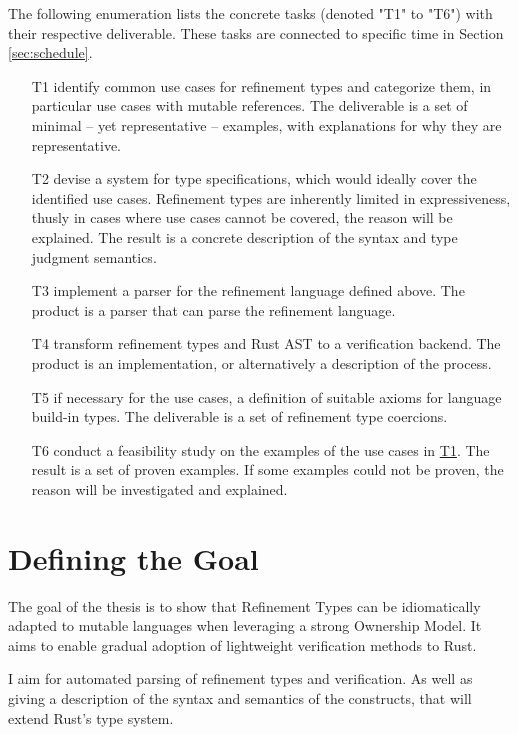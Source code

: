 \documentclass[11pt]{article}
\begin{document}
The following enumeration lists the concrete tasks (denoted "T1" to "T6") with their respective deliverable. These tasks are connected to specific time in Section \ref{sec:schedule}.

\begin{itemize}
	\item[T1] \label{itm:T1} identify common use cases for refinement types and categorize them, in particular use cases with mutable references. The deliverable is a set of minimal -- yet representative -- examples, with explanations for why they are representative.
	\item[T2] devise a system for type specifications, which would ideally cover the identified use cases. Refinement types are inherently limited in expressiveness, thusly in cases where use cases cannot be covered, the reason will be explained. The result is a concrete description of the syntax and type judgment semantics.
	\item[T3] implement a parser for the refinement language defined above. The product is a parser that can parse the refinement language.
	\item[T4] transform refinement types and Rust AST to a verification backend. The product is an implementation, or alternatively a description of the process.
	\item[T5] if necessary for the use cases, a definition of suitable axioms for language build-in types. The deliverable is a set of refinement type coercions.
	\item[T6] conduct a feasibility study on the examples of the use cases in \hyperref[itm:T1]{T1}. The result is a set of proven examples. If some examples could not be proven, the reason will be investigated and explained.
\end{itemize}


\section{Defining the Goal}

The goal of the thesis is to show that Refinement Types can be idiomatically adapted to mutable languages when leveraging a strong Ownership Model. It aims to enable gradual adoption of lightweight verification methods to Rust.

I aim for automated parsing of refinement types and verification. As well as giving a description of the syntax and semantics of the constructs, that will extend Rust's type system.
\end{document}
